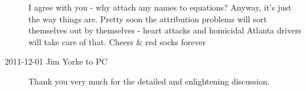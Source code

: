 \begin{description}
I agree with you - why attach any names to equations? Anyway, it's just
the way things are. Pretty soon the attribution problems will sort
themselves out by themselves - heart attacks and homicidal Atlanta
drivers will take care of that. Cheers \& red socks forever

\item[2011-12-01 Jim Yorke to PC] Thank you very much for the detailed
and enlightening discussion.

\end{description}

%

%

%


